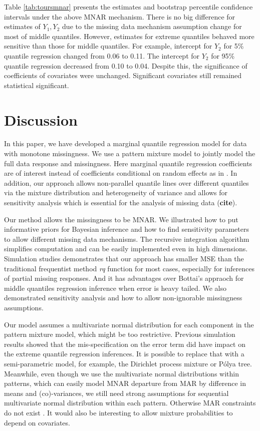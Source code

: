 \documentclass[12pt]{article}
\newcommand{\polya}{P\'{o}lya}
\begin{document}
Table \ref{tab:toursmnar} presents the estimates and bootstrap
percentile confidence intervals under the above MNAR mechanism. There
is no big difference for estimates of $Y_1, Y_2$ due to the missing
data mechanism assumption change for most of middle
quantiles. However, estimates for extreme quantiles behaved more
sensitive than those for middle quantiles.  For example, intercept for
$Y_2$ for 5\% quantile regression changed from 0.06 to 0.11.  The
intercept for $Y_2$ for 95\% quantile regression decreased from 0.10
to 0.04.  Despite this, the significance of coefficients of covariates
were unchanged. Significant covariates still remained statistical
significant.

\section{Discussion}
\label{sec:discussion}

In this paper, we have developed a marginal quantile regression model
for data with monotone missingness. We use a pattern mixture model to
jointly model the full data response and missingness. Here marginal
quantile regression coefficients are of interest instead of
coefficients conditional on random effects as in \citet{yuan2010}. In
addition, our approach allows non-parallel quantile lines over
different quantiles via the mixture distribution and heterogeneity of
variance and allows for sensitivity analysis which is essential for
the analysis of missing data ({\bf cite}).

Our method allows the missingness to be MNAR.  We illustrated how to
put informative priors for Bayesian inference and how to find
sensitivity parameters to allow different missing data mechanisms.
The recursive integration algorithm simplifies computation and can be
easily implemented even in high dimensions.  Simulation studies
demonstrates that our approach has smaller MSE than the traditional
frequentist method \textit{rq} function for most cases, especially for
inferences of partial missing responses. And it has advantages over
Bottai's appraoch for middle quantiles regression inference when error
is heavy tailed. We also demonstrated sensitivity analysis and how to
allow non-ignorable missingness assumptions.

Our model assumes a multivariate normal distribution for each
component in the pattern mixture model, which might be too
restrictive. Previous simulation results showed that the
mis-specification on the error term did have impact on the extreme
quantile regression inferences.  It is possible to replace that with a
semi-parametric model, for example, the Dirichlet process mixture or
\polya{} tree.  Meanwhile, even though we use the multivariate normal
distributions within patterns, which can easily model MNAR departure
from MAR by difference in means and (co)-variances, we still need
strong assumptions for sequential multivariate normal distribution
within each pattern. Otherwise MAR constraints do not exist
\citep{wang2011}.  It would also be interesting to allow mixture
probabilities to depend on covariates.
\end{document}
